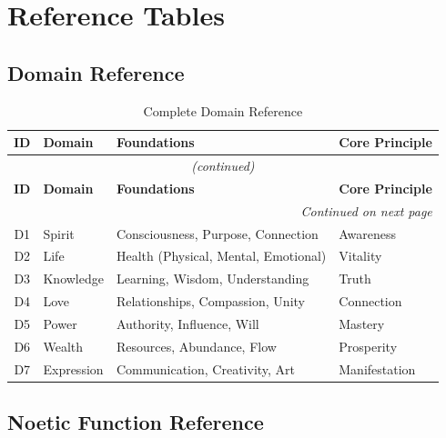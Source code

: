 \documentclass[11pt,twoside,openright]{book}
\theoremstyle{definition}
\theoremstyle{plain}
\theoremstyle{remark}
\begin{document}
\chapter{Reference Tables}
\label{ch:reference}

\section{Domain Reference}

\begin{center}
\begin{longtable}{clll}
\caption{Complete Domain Reference} \\
\toprule
\textbf{ID} & \textbf{Domain} & \textbf{Foundations} & \textbf{Core Principle} \\
\midrule
\endfirsthead
\multicolumn{4}{c}{\textit{(continued)}} \\
\toprule
\textbf{ID} & \textbf{Domain} & \textbf{Foundations} & \textbf{Core Principle} \\
\midrule
\endhead
\midrule
\multicolumn{4}{r}{\textit{Continued on next page}} \\
\endfoot
\bottomrule
\endlastfoot
D1 & Spirit & Consciousness, Purpose, Connection & Awareness \\
D2 & Life & Health (Physical, Mental, Emotional) & Vitality \\
D3 & Knowledge & Learning, Wisdom, Understanding & Truth \\
D4 & Love & Relationships, Compassion, Unity & Connection \\
D5 & Power & Authority, Influence, Will & Mastery \\
D6 & Wealth & Resources, Abundance, Flow & Prosperity \\
D7 & Expression & Communication, Creativity, Art & Manifestation \\
\end{longtable}
\end{center}

\section{Noetic Function Reference}
\end{document}
